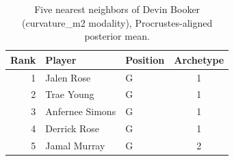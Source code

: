 \begin{table}[htbp]
  \centering\small
  \begin{tabular}{rllc}
    \toprule
    Rank & Player & Position & Archetype \\
    \midrule
    1 & Jalen Rose & G & 1 \\
    2 & Trae Young & G & 1 \\
    3 & Anfernee Simons & G & 1 \\
    4 & Derrick Rose & G & 1 \\
    5 & Jamal Murray & G & 2 \\
    \bottomrule
  \end{tabular}
  \caption{Five nearest neighbors of Devin Booker (curvature_m2 modality), Procrustes-aligned posterior mean.}
  \label{tab:Devin_Booker_neighbors_curvature_m2}
\end{table}

